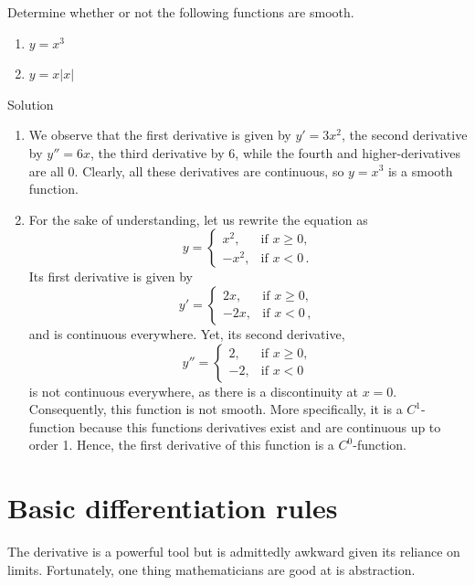 \begin{example}
Determine whether or not the following functions are smooth.
\begin{multicols}{2}
\begin{enumerate}
\item $y=x^3$
\item $y= x\left|x\right|$
\end{enumerate}
\end{multicols}

Solution 

\begin{enumerate}
\item We observe that the first derivative is given by $y'=3x^2$, the second derivative by $y''=6x$, the third derivative by $6$, while the fourth and higher-derivatives are all 0. Clearly, all these derivatives are continuous, so $y=x^3$ is a smooth function. 
\item For the sake of understanding, let us rewrite the equation as
$$
\displaystyle y={\begin{cases}x^2,&{\mbox{if }}x\geq 0,\\-x^2,&{\text{if }}x<0\,.\end{cases}}
$$
Its first derivative is given by
$$
\displaystyle y'={\begin{cases}2x,&{\mbox{if }}x\geq 0,\\-2x,&{\text{if }}x<0\,,\end{cases}}
$$
and is continuous everywhere. Yet, its second derivative,
$$
\displaystyle y''={\begin{cases}2,&{\mbox{if }}x\geq 0,\\-2,&{\text{if }}x<0\,\end{cases}}
$$
is not continuous everywhere, as there is a discontinuity at $x=0$. Consequently, this function is not smooth. \ifanalysis 
More specifically, it is a $C^1$-function because this functions derivatives exist and are continuous up to order 1. Hence, the first derivative of this function is a $C^0$-function. 
 \fi
\end{enumerate}
\end{example}




\fi



\section{Basic differentiation rules}\label{sec:basic_diff_rules}
The derivative is a powerful tool but is admittedly awkward given its reliance on limits. Fortunately, one thing mathematicians are good at is abstraction.

